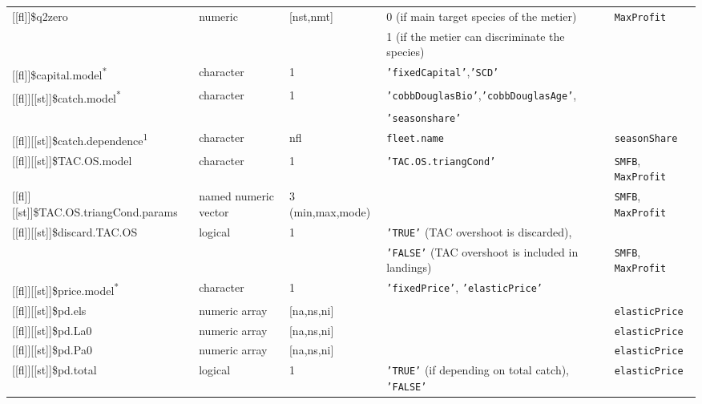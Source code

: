 \begin{landscape}
\begin{table}[!ht]
\begin{footnotesize}
\begin{threeparttable}
\begin{tabular}{lllll}
        {[[fl]]}\$q2zero & numeric & [nst,nmt] & 0 (if main target species of the metier) & \texttt{MaxProfit} \\
         &  &  & 1 (if the metier can discriminate the species) &  \\
        {[[fl]]}\$capital.model\textsuperscript{*} & character & 1 & \texttt{'fixedCapital'},\texttt{'SCD'} & \\
        {[[fl]]}[[st]]\$catch.model\textsuperscript{*} & character & 1 & \texttt{'cobbDouglasBio'},\texttt{'cobbDouglasAge'}, &  \\
         &  &  & \texttt{'seasonshare'}  &	\\
        {[[fl]]}[[st]]\$catch.dependence\textsuperscript{1} & character & nfl & \texttt{fleet.name} \ & \texttt{seasonShare} \\
        {[[fl]]}[[st]]\$TAC.OS.model & character & 1 & \texttt{'TAC.OS.triangCond'} & \texttt{SMFB}, \texttt{MaxProfit} \\
        {[[fl]]}[[st]]\$TAC.OS.triangCond.params & named numeric vector & 3 (min,max,mode) &  & \texttt{SMFB}, \texttt{MaxProfit} \\
        {[[fl]]}[[st]]\$discard.TAC.OS & logical & 1 & \texttt{'TRUE'} (TAC overshoot is discarded), \\
         &  &  & \texttt{'FALSE'} (TAC overshoot is included in landings) & \texttt{SMFB}, \texttt{MaxProfit} \\
        {[[fl]]}[[st]]\$price.model\textsuperscript{*} & character & 1 & \texttt{'fixedPrice'}, \texttt{'elasticPrice'} &  \\
        {[[fl]]}[[st]]\$pd.els & numeric array & [na,ns,ni] &  &  \texttt{elasticPrice} \\
        {[[fl]]}[[st]]\$pd.La0 & numeric array & [na,ns,ni] &  &  \texttt{elasticPrice} \\
        {[[fl]]}[[st]]\$pd.Pa0 & numeric array & [na,ns,ni] &  &  \texttt{elasticPrice} \\
        {[[fl]]}[[st]]\$pd.total & logical & 1 & \texttt{'TRUE'} (if depending on total catch), \texttt{'FALSE'} & 
          \texttt{elasticPrice} \\
        \hline
      \end{tabular}
      

\end{threeparttable}
\end{footnotesize}
\end{table}
\end{landscape}
